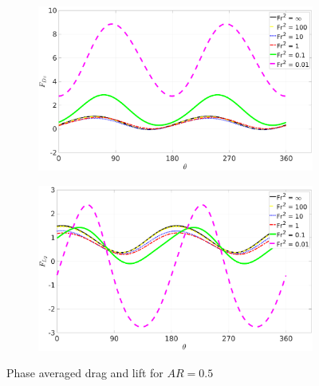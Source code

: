 \begin{figure}
    \centering
    \begin{subfigure}[b]{0.49\textwidth}
        \centering
        \includegraphics[width=\textwidth]{images/spinning_ellipse/padrag0p5.eps}
        \caption{}
        \label{fig:padrag0p5}
    \end{subfigure}
    \hfill
    \begin{subfigure}[b]{0.49\textwidth}
        \centering
        \includegraphics[width=\textwidth]{images/spinning_ellipse/palift0p5.eps}
        \caption{}
        \label{fig:palift0p5}
    \end{subfigure}
    \caption{Phase averaged drag and lift for $AR = 0.5$}
    \label{fig:pa0p5}
\end{figure}


